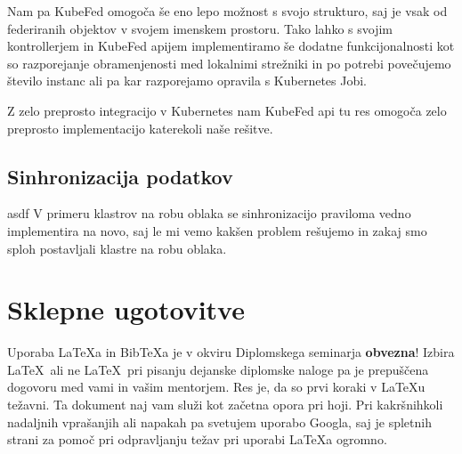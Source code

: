 \documentclass[a4paper, 12pt]{book}
\newcommand{\BibTeX}{{\sc Bib}\TeX}
\begin{document}
Nam pa KubeFed omogoča še eno lepo možnost s svojo strukturo, saj je vsak od federiranih objektov v svojem imenskem prostoru.
Tako lahko s svojim kontrollerjem in KubeFed apijem implementiramo še dodatne funkcijonalnosti kot so razporejanje obramenjenosti med lokalnimi strežniki in po potrebi povečujemo število instanc ali pa kar razporejamo opravila s Kubernetes Jobi.

Z zelo preprosto integracijo v Kubernetes nam KubeFed api tu res omogoča zelo preprosto implementacijo katerekoli naše rešitve.
\section{Sinhronizacija podatkov}
asdf V primeru klastrov na robu oblaka se sinhronizacijo praviloma vedno implementira na novo, saj le mi vemo kakšen problem rešujemo in zakaj smo sploh postavljali klastre na robu oblaka.


\chapter{Sklepne ugotovitve}
Uporaba \LaTeX{a} in \BibTeX{a} je v okviru Diplomskega seminarja \textbf{obvezna}!
Izbira \LaTeX\ ali ne \LaTeX\ pri pisanju dejanske diplomske naloge pa je pre\-pu\-šče\-na dogovoru med vami in vašim mentorjem.
Res je, da so prvi koraki v \LaTeX{}u težavni. 
Ta dokument naj vam služi kot začetna opora pri hoji.
Pri kakršnihkoli nadaljnih vprašanjih ali napakah pa svetujem uporabo Googla, saj je spletnih strani za pomoč pri odpravljanju težav pri uporabi \LaTeX{}a ogromno.
\newpage %
\ \\
\clearpage
{}


\end{document}
